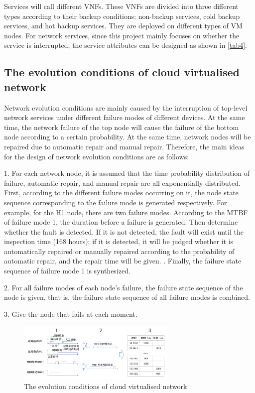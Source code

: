 \documentclass[journal]{IEEEtran}
\begin{document}
    Services will call different VNFs. These VNFs are divided into three different types according to their backup conditions: non-backup services, cold backup services, and hot backup services. They are deployed on different types of VM nodes. For network services, since this project mainly focuses on whether the service is interrupted, the service attributes can be designed as shown in \ref{tab4}.

    \subsection{The evolution conditions of cloud virtualised network}
    Network evolution conditions are mainly caused by the interruption of top-level network services under different failure modes of different devices. At the same time, the network failure of the top node will cause the failure of the bottom node according to a certain probability. At the same time, network nodes will be repaired due to automatic repair and manual repair. Therefore, the main ideas for the design of network evolution conditions are as follows:

    1. For each network node, it is assumed that the time probability distribution of failure, automatic repair, and manual repair are all exponentially distributed. First, according to the different failure modes occurring on it, the node state sequence corresponding to the failure mode is generated respectively. For example, for the H1 node, there are two failure modes. According to the MTBF of failure mode 1, the duration before a failure is generated. Then determine whether the fault is detected. If it is not detected, the fault will exist until the inspection time (168 hours); if it is detected, it will be judged whether it is automatically repaired or manually repaired according to the probability of automatic repair, and the repair time will be given. . Finally, the failure state sequence of failure mode 1 is synthesized.

    2. For all failure modes of each node's failure, the failure state sequence of the node is given, that is, the failure state sequence of all failure modes is combined.

    3. Give the node that fails at each moment.

    \begin{figure}[!t]
        \begin{center}
            \includegraphics[width = 3in]{img/3.eps}
            \caption{The evolution conditions of cloud virtualised network}
            \label{fig3}
        \end{center}
    \end{figure}
\end{document}
